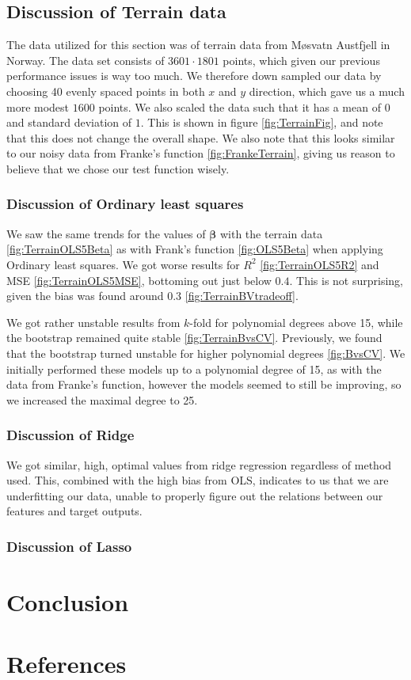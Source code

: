 \documentclass{article}
\begin{document}
\subsection{Discussion of Terrain data}
The data utilized for this section was of terrain data from Møsvatn Austfjell in Norway. The data set consists of $3601 \cdot 1801$ points, which given our previous performance issues is way too much. We therefore down sampled our data by choosing 40 evenly spaced points in both $x$ and $y$ direction, which gave us a much more modest $1600$ points. We also scaled the data such that it has a mean of $0$ and standard deviation of $1$. This is shown in figure \ref{fig:TerrainFig}, and note that this does not change the overall shape. We also note that this looks similar to our noisy data from Franke's function \ref{fig:FrankeTerrain}, giving us reason to believe that we chose our test function wisely.

\subsubsection{Discussion of Ordinary least squares}
We saw the same trends for the values of $\boldsymbol{\beta}$ with the terrain data \ref{fig:TerrainOLS5Beta} as with Frank's function \ref{fig:OLS5Beta} when applying Ordinary least squares. We got worse results for $R^2$ \ref{fig:TerrainOLS5R2} and MSE \ref{fig:TerrainOLS5MSE}, bottoming out just below $0.4$. This is not surprising, given the bias was found around $0.3$ \ref{fig:TerrainBVtradeoff}.

We got rather unstable results from $k$-fold for polynomial degrees above 15, while the bootstrap remained quite stable \ref{fig:TerrainBvsCV}. Previously, we found that the bootstrap turned unstable for higher polynomial degrees \ref{fig:BvsCV}. We initially performed these models up to a polynomial degree of 15, as with the data from Franke's function, however the models seemed to still be improving, so we increased the maximal degree to 25.

\subsubsection{Discussion of Ridge}
We got similar, high, optimal values from ridge regression regardless of method used. This, combined with the high bias from OLS, indicates to us that we are underfitting our data, unable to properly figure out the relations between our features and target outputs.

\subsubsection{Discussion of Lasso}

\section{Conclusion}

\section{References}

\end{document}
